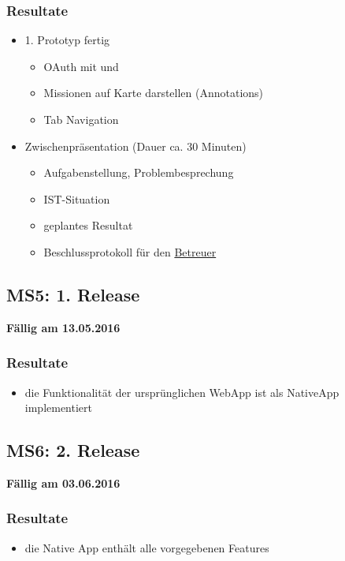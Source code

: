 \subsubsection{Resultate}
\begin{itemize}
	\item 1. Prototyp fertig
	\begin{itemize}
		\item OAuth mit  und 
		\item Missionen auf Karte darstellen (Annotations)
		\item Tab Navigation
	\end{itemize}
	\item Zwischenpräsentation (Dauer ca. 30 Minuten)
	\begin{itemize}
		\item Aufgabenstellung, Problembesprechung
		\item IST-Situation
		\item geplantes Resultat
		\item Beschlussprotokoll für den \hyperref[pm-rollen]{Betreuer}
	\end{itemize}
\end{itemize}

\subsection{MS5: 1. Release}
\label{pm-ms5}
\textbf{Fällig am 13.05.2016}
\subsubsection{Resultate}
\begin{itemize}
	\item die Funktionalität der ursprünglichen \kort{} \gls{WebApp} ist als \gls{NativeApp} implementiert
\end{itemize}

\subsection{MS6: 2. Release}
\label{pm-ms6}
\textbf{Fällig am 03.06.2016}
\subsubsection{Resultate}
\begin{itemize}
	\item die Native App enthält alle vorgegebenen Features
\end{itemize}

